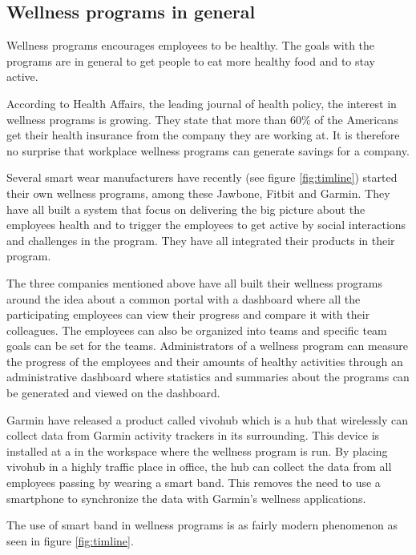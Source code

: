 \documentclass{cslthse-msc}
\begin{document}
\subsection{Wellness programs in general}
\label{sec:wellness-programs}

Wellness programs encourages employees to be healthy. The goals with the programs are in general to get people to eat more healthy food and to stay active.

According to Health Affairs, the leading journal of health policy, the interest in wellness programs is growing\cite{baicker2010workplace}. They state that more than 60\% of the Americans get their health insurance from the company they are working at. It is therefore no surprise that workplace wellness programs can generate savings for a company. 

Several smart wear manufacturers have recently (see figure \ref{fig:timline}) started their own wellness programs, among these Jawbone\cite{JawboneWellness}, Fitbit\cite{FitbitWellness} and Garmin\cite{GarminWellness}. They have all built a system that focus on delivering the big picture about the employees health and to trigger the employees to get active by social interactions and challenges in the program. They have all integrated their products in their program. 

The three companies mentioned above have all built their wellness programs around the idea about a common portal with a dashboard where all the participating employees can view their progress and compare it with their colleagues. The employees can also be organized into teams and specific team goals can be set for the teams. Administrators of a wellness program can measure the progress of the employees and their amounts of healthy activities through an administrative dashboard where statistics and summaries about the programs can be generated and viewed on the dashboard. 

Garmin have released a product called vivohub which is a hub that wirelessly can collect data from Garmin activity trackers in its surrounding. This device is installed at a in the workspace where the wellness program is run. By placing vivohub in a highly traffic place in office, the hub can collect the data from all employees passing by wearing a smart band. This removes the need to use a smartphone to synchronize the data with Garmin's wellness applications\cite{vivohub}. 

The use of smart band in wellness programs is as fairly modern phenomenon as seen in figure \ref{fig:timline}\cite{fitbitWellnessStat}\cite{jawboneWellnessStat}\cite{garminWellnessStat}.
\end{document}
